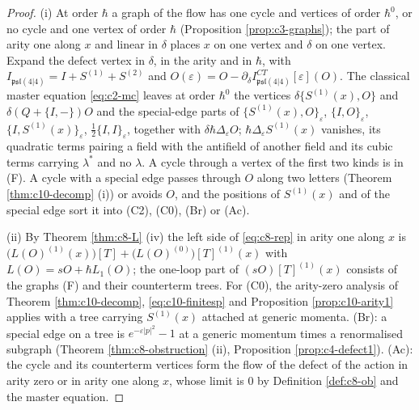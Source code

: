 \begin{proof}
(i) At order $\hbar$ a graph of the flow has one cycle and vertices of order $\hbar^0$, or no cycle and one vertex of order $\hbar$ (Proposition \ref{prop:c3-graphs}); the part of arity one along $x$ and linear in $\delta$ places $x$ on one vertex and $\delta$ on one vertex. Expand the defect vertex in $\delta$, in the arity and in $\hbar$, with $I_{\mathfrak{psl}(4|4)}=I+S^{(1)}+S^{(2)}$ and $O(\varepsilon)=O-\partial_\delta I^{CT}_{\mathfrak{psl}(4|4)}[\varepsilon](O)$. The classical master equation \eqref{eq:c2-mc} leaves at order $\hbar^0$ the vertices $\delta\{S^{(1)}(x),O\}$ and $\delta(Q+\{I,-\})O$ and the special-edge parts of $\{S^{(1)}(x),O\}_\varepsilon$, $\{I,O\}_\varepsilon$, $\{I,S^{(1)}(x)\}_\varepsilon$, $\tfrac12\{I,I\}_\varepsilon$, together with $\delta\hbar\Delta_\varepsilon O$; $\hbar\Delta_\varepsilon S^{(1)}(x)$ vanishes, its quadratic terms pairing a field with the antifield of another field and its cubic terms carrying $\lambda^*$ and no $\lambda$. A cycle through a vertex of the first two kinds is in (F). A cycle with a special edge passes through $O$ along two letters (Theorem \ref{thm:c10-decomp} (i)) or avoids $O$, and the positions of $S^{(1)}(x)$ and of the special edge sort it into (C2), (C0), (Br) or (Ac).

(ii) By Theorem \ref{thm:c8-L} (iv) the left side of \eqref{eq:c8-rep} in arity one along $x$ is $\big(L(O)^{(1)}(x)\big)[T]+\big(L(O)^{(0)}\big)[T]^{(1)}(x)$ with $L(O)=sO+\hbar L_1(O)$; the one-loop part of $(sO)[T]^{(1)}(x)$ consists of the graphs (F) and their counterterm trees. For (C0), the arity-zero analysis of Theorem \ref{thm:c10-decomp}, \eqref{eq:c10-finitesp} and Proposition \ref{prop:c10-arity1} applies with a tree carrying $S^{(1)}(x)$ attached at generic momenta. (Br): a special edge on a tree is $e^{-\varepsilon|p|^2}-1$ at a generic momentum times a renormalised subgraph (Theorem \ref{thm:c8-obstruction} (ii), Proposition \ref{prop:c4-defect1}). (Ac): the cycle and its counterterm vertices form the flow of the defect of the action in arity zero or in arity one along $x$, whose limit is $0$ by Definition \ref{def:c8-ob} and the master equation.


\end{proof}
